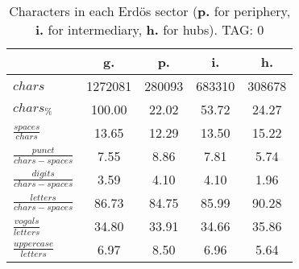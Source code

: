 \begin{table}[h!]
\begin{center}
\begin{tabular}{| l | c | c | c | c |}\hline
 & g. & p. & i. & h. \\\hline
$chars$ & 1272081  & 280093  & 683310  & 308678 \\\hline
$chars_{\%}$ & 100.00  & 22.02  & 53.72  & 24.27 \\\hline
$\frac{spaces}{chars}$ & 13.65  & 12.29  & 13.50  & 15.22 \\\hline
$\frac{punct}{chars-spaces}$ & 7.55  & 8.86  & 7.81  & 5.74 \\\hline
$\frac{digits}{chars-spaces}$ & 3.59  & 4.10  & 4.10  & 1.96 \\\hline
$\frac{letters}{chars-spaces}$ & 86.73  & 84.75  & 85.99  & 90.28 \\\hline
$\frac{vogals}{letters}$ & 34.80  & 33.91  & 34.66  & 35.86 \\\hline
$\frac{uppercase}{letters}$ & 6.97  & 8.50  & 6.96  & 5.64 \\\hline
\end{tabular}
\caption{Characters in each Erd\"os sector ({{\bf p.}} for periphery, {{\bf i.}} for intermediary, 
    {{\bf h.}} for hubs). TAG: 0}
\end{center}
\end{table}